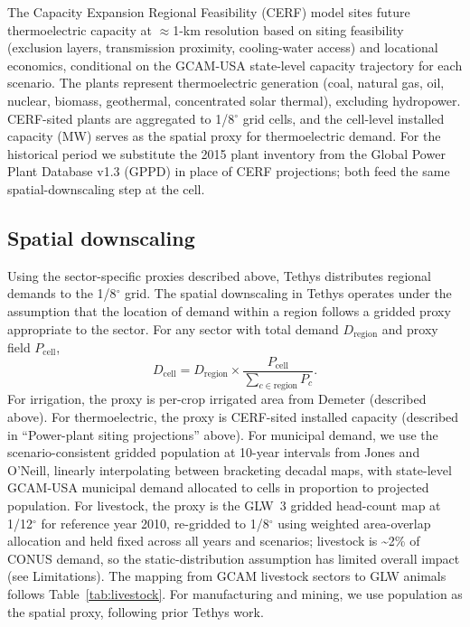 \documentclass[fleqn,10pt]{wlscirep}
\begin{document}
The Capacity Expansion Regional Feasibility (CERF) model\cite{Vernon2021,Mongird2025CERF} sites future thermoelectric capacity at $\approx$1-km resolution based on siting feasibility (exclusion layers, transmission proximity, cooling-water access) and locational economics, conditional on the GCAM-USA state-level capacity trajectory for each scenario. The plants represent thermoelectric generation (coal, natural gas, oil, nuclear, biomass, geothermal, concentrated solar thermal), excluding hydropower. CERF-sited plants are aggregated to 1/8$^{\circ}$ grid cells, and the cell-level installed capacity (MW) serves as the spatial proxy for thermoelectric demand. For the historical period we substitute the 2015 plant inventory from the Global Power Plant Database v1.3 (GPPD)\cite{globalpowerplantdb} in place of CERF projections; both feed the same spatial-downscaling step at the cell.

\subsection*{Spatial downscaling}

Using the sector-specific proxies described above, Tethys distributes regional demands to the 1/8$^{\circ}$ grid. The spatial downscaling in Tethys operates under the assumption that the location of demand within a region follows a gridded proxy appropriate to the sector. For any sector with total demand $D_{\mathrm{region}}$ and proxy field $P_{\mathrm{cell}}$,
\begin{equation}
D_{\mathrm{cell}} = D_{\mathrm{region}} \times \frac{P_{\mathrm{cell}}}{\sum_{c \in \mathrm{region}} P_{c}}.
\label{eq:spatial}
\end{equation}
For irrigation, the proxy is per-crop irrigated area from Demeter (described above). For thermoelectric, the proxy is CERF-sited installed capacity (described in ``Power-plant siting projections'' above). For municipal demand, we use the scenario-consistent gridded population at 10-year intervals from Jones and O'Neill\cite{Jones_2016}, linearly interpolating between bracketing decadal maps, with state-level GCAM-USA municipal demand allocated to cells in proportion to projected population. For livestock, the proxy is the GLW~3 gridded head-count map\cite{Gilbert2018} at 1/12$^{\circ}$ for reference year 2010, re-gridded to 1/8$^{\circ}$ using weighted area-overlap allocation and held fixed across all years and scenarios; livestock is \textasciitilde2\% of CONUS demand, so the static-distribution assumption has limited overall impact (see Limitations). The mapping from GCAM livestock sectors to GLW animals follows Table~\ref{tab:livestock}. For manufacturing and mining, we use population as the spatial proxy, following prior Tethys work\cite{Khan2023}.
\end{document}
